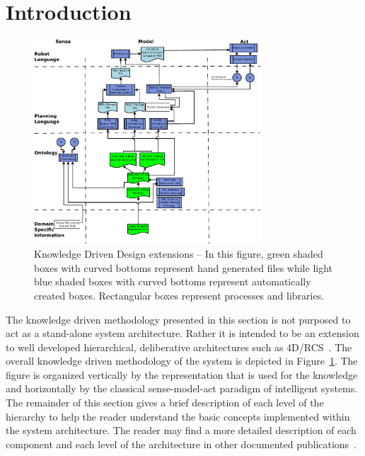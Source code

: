 \section{Introduction}

\begin{figure}[!t!h!b!]
\centering
\includegraphics[width=8.5cm]{Figure/KnowledgeDrivenRobotics.pdf}
\caption{Knowledge Driven Design extensions -- In this figure, green shaded
  boxes with curved bottoms represent hand generated files while light blue
  shaded boxes with curved bottoms represent automatically created boxes.
  Rectangular boxes represent processes and libraries. }
\label{fig:methodology}
\end{figure}
The knowledge driven methodology presented in this section is not purposed
to act as a stand-alone system architecture. Rather it is intended to be an
extension to well developed hierarchical, deliberative architectures such
as 4D/RCS~\cite{Albus2000}. The overall knowledge driven methodology of the
system is depicted in Figure~\ref{fig:methodology}. The figure is organized
vertically by the representation that is used for the knowledge and
horizontally by the classical sense-model-act paradigm of intelligent
systems. The remainder of this section gives a brief description of each
level of the hierarchy to help the reader understand the basic concepts
implemented within the system architecture. The reader may find a more
detailed description of each component and each level of the architecture
in other documented
publications~\cite{NISTIR.Balakirsky,BALAKIRSKY.IROS.2012}.
